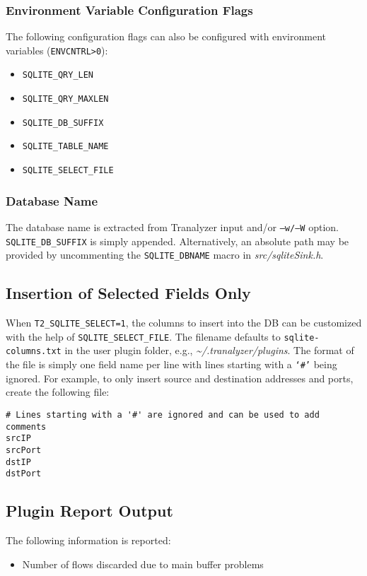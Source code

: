 \documentclass[documentation]{subfiles}
\begin{document}
\subsubsection{Environment Variable Configuration Flags}
The following configuration flags can also be configured with environment variables ({\tt ENVCNTRL>0}):
\begin{itemize}
    \item {\tt SQLITE\_QRY\_LEN}
    \item {\tt SQLITE\_QRY\_MAXLEN}
    \item {\tt SQLITE\_DB\_SUFFIX}
    \item {\tt SQLITE\_TABLE\_NAME}
    \item {\tt SQLITE\_SELECT\_FILE}
\end{itemize}

\subsubsection{Database Name}\label{sqlite:dbname}
The database name is extracted from Tranalyzer input and/or {\tt --w/--W} option.
{\tt SQLITE\_DB\_SUFFIX} is simply appended.
Alternatively, an absolute path may be provided by uncommenting the {\tt SQLITE\_DBNAME} macro in {\em src/sqliteSink.h}.

\subsection{Insertion of Selected Fields Only}\label{sqlite:select}

When {\small\tt T2\_SQLITE\_SELECT=1}, the columns to insert into the DB can be customized with the help of {\small\tt SQLITE\_SELECT\_FILE}.
The filename defaults to {\tt sqlite-columns.txt} in the user plugin folder, e.g., {\em \textasciitilde{}/.tranalyzer/plugins}.
The format of the file is simply one field name per line with lines starting with a {\tt `\#'} being ignored.
For example, to only insert source and destination addresses and ports, create the following file:

\begin{verbatim}
# Lines starting with a '#' are ignored and can be used to add comments
srcIP
srcPort
dstIP
dstPort
\end{verbatim}

\subsection{Plugin Report Output}
The following information is reported:
\begin{itemize}
    \item Number of flows discarded due to main buffer problems
\end{itemize}
\end{document}
